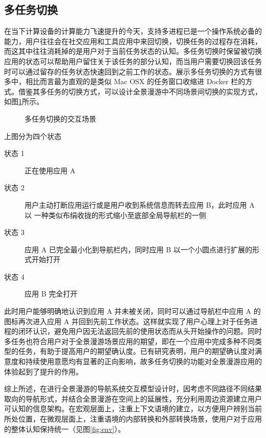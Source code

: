 \subsection{多任务切换}
在当下计算设备的计算能力飞速提升的今天，支持多进程已是一个操作系统必备的能力，用户往往会在社交应用和工具应用中来回切换，切换任务的过程存在消耗，而这其中往往消耗掉的是用户对于当前任务状态的认知。多任务切换时保留被切换应用的状态可以帮助用户留住关于该任务的部分认知，而当用户需要切换回该任务时可以通过留存的任务状态快速回到之前工作的状态。展示多任务切换的方式有很多中，相比而言最为直观的是类似 Mac OSX 的任务窗口收缩进 Docker 栏的方式。借鉴其多任务的切换方式，可以设计全景漫游中不同场景间切换的实现方式，如图\ref{fig:multitask}所示。

\begin{figure}[htp]
\centering
{}
\caption{多任务切换的交互场景}
\label{fig:multitask}
\end{figure}

上图分为四个状态
\begin{description}
	\item [状态 1] 正在使用应用 A
	\item [状态 2]用户主动打断应用运行或是用户收到系统信息而转去应用 B，此时应用 A 以 一种类似布绢收拢的形式缩小至底部全局导航栏的一侧
	\item [状态 3] 应用 A 已完全最小化到导航栏内，同时应用 B 以一个小圆点进行扩展的形式开始打开
	\item [状态 4] 应用 B 完全打开
\end{description}

此时用户能够明确地认识到应用 A 并未被关闭，同时可以通过导航栏中应用 A 的图标再次进入应用 A 并回到先前工作状态。这样就实现了用户心理上对于任务进程的闭环认识，避免用户因无法返回先前的使用状态而从头开始操作的问题。同时多任务也符合用户对于全景漫游场景应用的期望，即在一个应用中完成多种不同类型的任务，有助于提高用户的期望确认度。已有研究表明，用户的期望确认度对满意度和持续使用意愿均有显著的正向影响，故多任务切换的功能对全景漫游应用的体验起到了提升的作用。

综上所述，在进行全景漫游的导航系统交互模型设计时，因考虑不同路径不同结果取向的导航形式，并结合全景漫游在空间上的延展性，充分利用周边资源建立用户可认知的信息架构。在宏观层面上，注重上下文语境的建立，以方便用户辨别当前所处位置，在微观层面上，注重语境的内部转换和外部转换场景，使用户对于应用的整体认知保持统一（见图\ref{fig:env}）。

